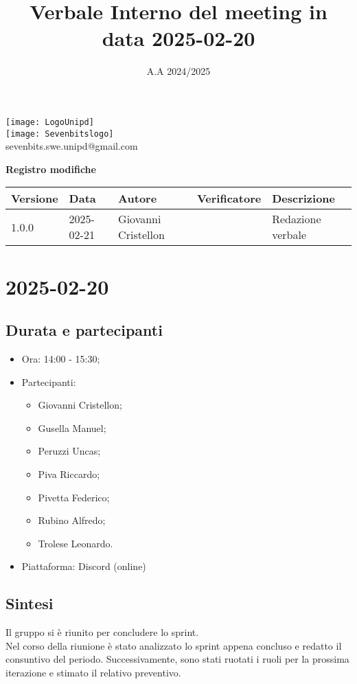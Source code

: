 \documentclass[10pt]{article}
\title{Verbale Interno del meeting in data 2025-02-20}
\date{A.A 2024/2025}
\begin{document}
\maketitle
\begin{center}
\texttt{[image: LogoUnipd]}\\
\texttt{[image: Sevenbitslogo]}\\
sevenbits.swe.unipd@gmail.com\\
\vspace{2mm}

\textbf{Registro modifiche}\\
\vspace{2mm}
\begin{tabularx}{\textwidth}{|l|l|l|l|X|}
\hline
\textbf{Versione} & \textbf{Data} & \textbf{Autore} & \textbf{Verificatore} & \textbf{Descrizione} \\
\hline
1.0.0 & 2025-02-21 & Giovanni Cristellon &  & Redazione verbale \\
\end{tabularx}
\end{center}

\newpage
\tableofcontents
\newpage
\section{2025-02-20}
\subsection{Durata e partecipanti}
\begin{itemize}
\item Ora: 14:00 - 15:30;
\item Partecipanti:
	\begin{itemize}
    	\item Giovanni Cristellon;
		\item Gusella Manuel;
		\item Peruzzi Uncas;
		\item Piva Riccardo;
		\item Pivetta Federico;
		\item Rubino Alfredo;
		\item Trolese Leonardo.
	\end{itemize}
\item Piattaforma: Discord (online)
\end{itemize}

\subsection{Sintesi}
Il gruppo si è riunito per concludere lo sprint.\\
Nel corso della riunione è stato analizzato lo sprint appena concluso e redatto il consuntivo del periodo. Successivamente, sono stati ruotati i ruoli per la prossima iterazione e stimato il relativo preventivo.
\end{document}
